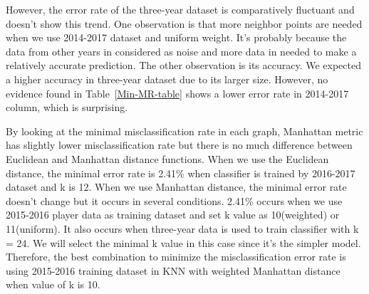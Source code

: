 \documentclass{article}
\begin{document}
However, the error rate of the three-year dataset is comparatively fluctuant and doesn’t show this trend. One observation is that more neighbor points are needed when we use 2014-2017 dataset and uniform weight. It’s probably because the data from other years in considered as noise and more data in needed to make a relatively accurate prediction. The other observation is its accuracy. We expected a higher accuracy in three-year dataset due to its larger size. However, no evidence found in Table~\ref{Min-MR-table} shows a lower error rate in 2014-2017 column, which is surprising.

By looking at the minimal misclassification rate in each graph, Manhattan metric has slightly lower misclassification rate but there is no much difference between Euclidean and Manhattan distance functions. When we use the Euclidean distance, the minimal error rate is 2.41\% when classifier is trained by 2016-2017 dataset and k is 12. When we use Manhattan distance, the minimal error rate doesn’t change but it occurs in several conditions. 2.41\% occurs when we use 2015-2016 player data as training dataset and set k value as 10(weighted) or 11(uniform). It also occurs when three-year data is used to train classifier with k = 24. We will select the minimal k value in this case since it’s the simpler model. Therefore, the best combination to minimize the misclassification error rate is using 2015-2016 training dataset in KNN with weighted Manhattan distance when value of k is 10. 
\end{document}
